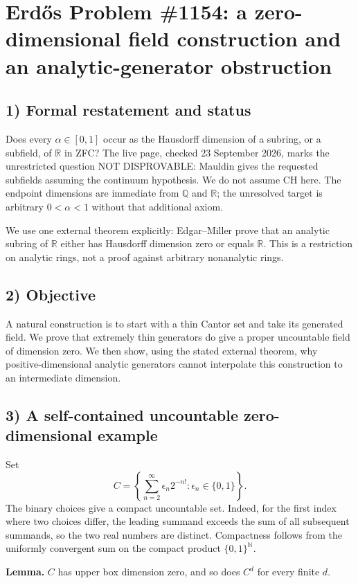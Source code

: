 \section{Erd\H{o}s Problem \#1154: a zero-dimensional field construction and an analytic-generator obstruction}

\subsection*{1) Formal restatement and status}
Does every $\alpha\in[0,1]$ occur as the Hausdorff dimension of a subring, or a subfield, of $\mathbb R$ in ZFC? The live page, checked 23 September 2026, marks the unrestricted question NOT DISPROVABLE: Mauldin gives the requested subfields assuming the continuum hypothesis. We do not assume CH here. The endpoint dimensions are immediate from $\mathbb Q$ and $\mathbb R$; the unresolved target is arbitrary $0<\alpha<1$ without that additional axiom.

We use one external theorem explicitly: Edgar--Miller prove that an analytic subring of $\mathbb R$ either has Hausdorff dimension zero or equals $\mathbb R$. This is a restriction on analytic rings, not a proof against arbitrary nonanalytic rings.

\subsection*{2) Objective}
A natural construction is to start with a thin Cantor set and take its generated field. We prove that extremely thin generators do give a proper uncountable field of dimension zero. We then show, using the stated external theorem, why positive-dimensional analytic generators cannot interpolate this construction to an intermediate dimension.

\subsection*{3) A self-contained uncountable zero-dimensional example}
Set
\[
 C=\left\{\sum_{n=2}^{\infty}\epsilon_n2^{-n!}:\epsilon_n\in\{0,1\}\right\}.
\]
The binary choices give a compact uncountable set. Indeed, for the first index where two choices differ, the leading summand exceeds the sum of all subsequent summands, so the two real numbers are distinct. Compactness follows from the uniformly convergent sum on the compact product $\{0,1\}^{\mathbb N}$.

\textbf{Lemma.} $C$ has upper box dimension zero, and so does $C^d$ for every finite $d$.


